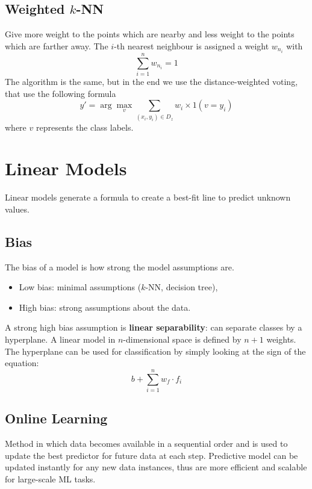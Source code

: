 \documentclass[a4paper,6pt,twocolumn,fleqn]{article}
\begin{document}
\subsection{Weighted \(k\)-NN} %
Give more weight to the points which are nearby and less weight to the points which are farther away. The \(i\)-th nearest neighbour is assigned a weight \(w_{n_i}\) with
\begin{equation}
    \sum_{i=1}^n w_{n_i} = 1
\end{equation}
The algorithm is the same, but in the end we use the distance-weighted voting, that use the following formula
\begin{equation}
    y' = \arg \max_v \sum_{(x_i,y_i) \in D_z} w_i \times 1(v=y_i)
\end{equation}
where \(v\) represents the class labels.

\section{Linear Models}
Linear models generate a formula to create a best-fit line to predict unknown values.
\subsection{Bias} %
The bias of a model is how strong the model assumptions are.
\begin{itemize}
    \item Low bias: minimal assumptions (\(k\)-NN, decision tree),
    \item High bias: strong assumptions about the data.
\end{itemize}
A strong high bias assumption is \textbf{linear separability}: can separate classes by a hyperplane.
A linear model in \(n\)-dimensional space is defined by \(n+1\) weights. The hyperplane can be used for classification by simply looking at the sign of the equation:
\begin{equation}
    b + \sum_{i=1}^n w_f \cdot f_i
\end{equation}
\subsection{Online Learning} %
Method in which data becomes available in a sequential order and is used to update the best predictor for future data at each step.
Predictive model can be updated instantly for any new data instances, thus are more efficient and scalable for large-scale ML tasks.
\end{document}
